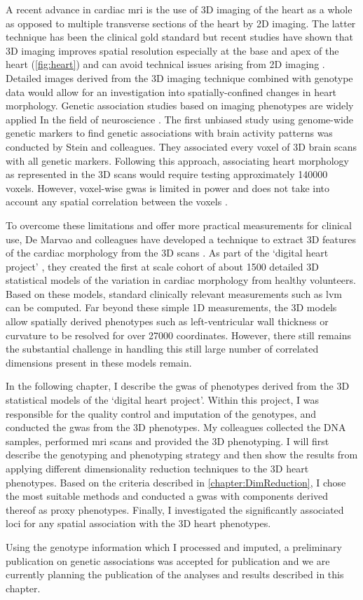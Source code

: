 A recent advance in cardiac \gls{mri} is the use of 3D imaging of the heart as a whole as opposed to multiple transverse sections of the heart by 2D imaging. The latter technique has been the clinical gold standard but recent studies have shown that 3D imaging improves spatial resolution especially at the base and apex of the heart (\cref{fig:heart}) and can avoid technical issues arising from 2D imaging \citep{deMarvao2014}. Detailed images derived from the 3D imaging technique combined with genotype data would allow for an investigation into spatially-confined changes in heart morphology. Genetic association studies based on imaging phenotypes are widely applied In the field of neuroscience \citep{Filippini2009,Ho2010,Jahanshad2013,Hibar2015}. The first unbiased study using genome-wide genetic markers to find genetic associations with brain activity patterns was conducted by Stein and colleagues. They associated every voxel of 3D brain scans with all genetic markers. Following this approach, associating heart morphology as represented in the 3D scans would require testing approximately \num{140000} voxels. However, voxel-wise \gls{gwas} is limited in power and does not take into account any spatial correlation between the voxels \citep{Ge2014}. 

To overcome these limitations and offer more practical measurements for clinical use, De Marvao and colleagues have developed a technique to extract 3D features of the cardiac morphology from the 3D scans \citep{deMarvao2014}. As part of the `digital heart project' \citep{Cook2010}, they created the first at scale cohort of about \num{1500} detailed 3D statistical models of the variation in cardiac morphology from healthy volunteers. Based on these models, standard clinically relevant measurements such as \gls{lvm} can be computed. Far beyond these simple 1D measurements, the 3D models allow spatially derived phenotypes such as left-ventricular wall thickness or curvature to be resolved for over \num{27000} coordinates. However, there still remains the substantial challenge in handling this still large number of correlated dimensions present in these models remain.

In the following chapter, I describe the \gls{gwas} of phenotypes derived from the 3D statistical models of the `digital heart project'. Within this project, I was responsible for the quality control and imputation of the genotypes, and conducted the \gls{gwas} from the 3D phenotypes. My colleagues collected the DNA samples, performed \gls{mri} scans and provided the 3D phenotyping. I will first describe the genotyping and phenotyping strategy and then show the results from applying different dimensionality reduction techniques to the 3D heart phenotypes. Based on the criteria described in \cref{chapter:DimReduction}, I chose the most suitable methods and conducted a \gls{gwas} with components derived thereof as proxy phenotypes. Finally, I investigated the significantly associated loci for any spatial association with the 3D heart phenotypes.

Using the genotype information which I processed and imputed, a preliminary publication on genetic associations was accepted for publication \citep{Biffi2017} and we are currently planning the publication of the analyses and results described in this chapter.


